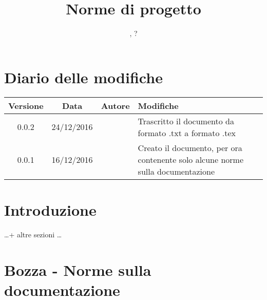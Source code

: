 


\title{Norme di progetto}
\author{\GG, ?}



\maketitle
\tableofcontents



\section{Diario delle modifiche}

\begin{tabular}{c | c | c | p{}}
	\textbf{Versione} & \textbf{Data} & \textbf{Autore} & \textbf{Modifiche} \\ \hline
	0.0.2 & 24/12/2016 & \GG & Trascritto il documento da formato .txt a formato .tex \\ \hline
	0.0.1 & 16/12/2016 & \GG & Creato il documento, per ora contenente solo alcune norme sulla documentazione \\ \hline
\end{tabular}



\section{Introduzione}

\dots + altre sezioni \dots



\section{Bozza - Norme sulla documentazione}

